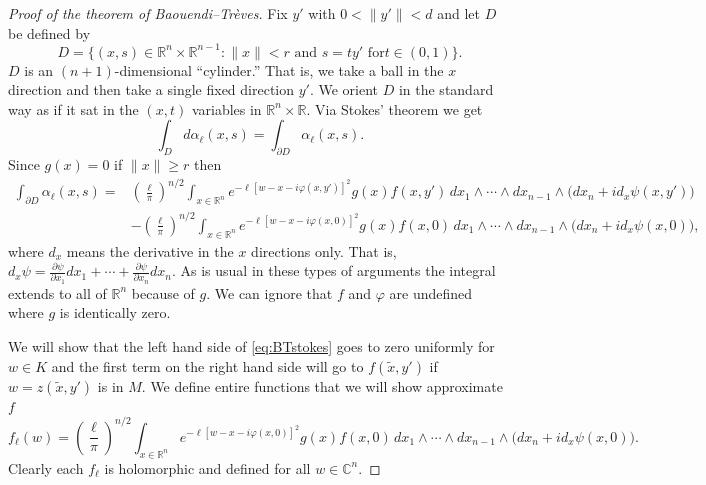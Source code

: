 \documentclass[12pt,openany]{book}
\newcommand{\snorm}[1]{\lVert {#1} \rVert}
\newcommand{\C}{{\mathbb{C}}}
\newcommand{\R}{{\mathbb{R}}}
\theoremstyle{plain}
\theoremstyle{remark}
\theoremstyle{definition}
\theoremstyle{exercise}
\theoremstyle{example}
\begin{document}
\begin{proof}[Proof of the theorem of Baouendi--Tr{\`e}ves]
%
Fix $y'$ with $0 < \snorm{y'} < d$ and let $D$ be defined by
\begin{equation*}
D = \bigl\{ (x,s) \in \R^n \times \R^{n-1} : \snorm{x} < r \text{ and } s = t y' \text{ for
$t \in (0,1)$} \bigr\} .
\end{equation*}
$D$ is an $(n+1)$-dimensional ``cylinder.''  That is, we take a ball in the
$x$ direction and then take a single fixed direction $y'$.  We orient $D$ in
the standard way as if it sat in the $(x,t)$ variables in $\R^n \times \R$.
Via Stokes' theorem we get
\begin{equation*}
\int_D d \alpha_{\ell} (x,s)
=
\int_{\partial D} \alpha_{\ell} (x,s) .
\end{equation*}
Since $g(x) = 0$ if $\snorm{x} \geq r$ then
\begin{equation} \label{eq:BTstokes}
\begin{split}
\int_{\partial D} \alpha_{\ell}(x,s)
=
&
{\left(\frac{\ell}{\pi}\right)}^{n/2}
\int_{x\in\R^n}
e^{-\ell [w - x-i\varphi(x,y')]^2 } g(x) f(x,y')
\,
dx_1  \wedge
\cdots \wedge
dx_{n-1}
\wedge
\bigl(dx_{n} + i d_x \psi (x,y') \bigr) 
\\
& 
-
{\left(\frac{\ell}{\pi}\right)}^{n/2}
\int_{x \in \R^n}
e^{  -\ell [w - x-i\varphi(x,0)]^2 } g(x) f(x,0)
\,
dx_1  \wedge
\cdots \wedge
dx_{n-1}
\wedge
\bigl(dx_{n} + i d_x \psi (x,0) \bigr) ,
\end{split}
\end{equation}
where $d_x$ means the derivative in the $x$ directions only.
That is, $d_x \psi =
\frac{\partial \psi}{\partial x_1} dx_1
+ \cdots +
\frac{\partial \psi}{\partial x_n} dx_n$.
As is usual in these types of arguments the integral extends to all of
$\R^n$ because of $g$.  We can ignore that $f$ and $\varphi$ are undefined
where $g$ is identically zero.

We will show that the left hand side of \eqref{eq:BTstokes} goes to zero uniformly for $w \in K$
and the first term on the right hand side will go to $f(\tilde{x},y')$
if $w = z(\tilde{x},y')$ is in $M$.  We
define entire functions that we will show approximate $f$
\begin{equation*}
f_\ell(w)
=
{\left(\frac{\ell}{\pi}\right)}^{n/2}
\int_{x \in \R^n}
e^{  -\ell [w - x-i\varphi(x,0)]^2 } g(x) f(x,0)
\,
dx_1  \wedge
\cdots \wedge
dx_{n-1}
\wedge
\bigl(dx_{n} + i d_x \psi (x,0) \bigr) .
\end{equation*}
Clearly each $f_\ell$ is holomorphic and defined for all $w \in \C^n$.


\end{proof}
\end{document}
